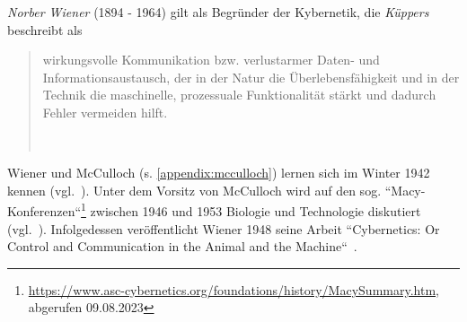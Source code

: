 \textit{Norber Wiener} (1894 - 1964) gilt als Begründer der Kybernetik, die \textit{Küppers} beschreibt als

\blockquote[{~\cite[2]{Kup19}}]{
    wirkungsvolle Kommunikation bzw. verlustarmer Daten- und Informationsaustausch, der in der Natur die Überlebensfähigkeit und in der Technik die maschinelle, prozessuale Funktionalität stärkt und dadurch Fehler vermeiden hilft.
}

Wiener und McCulloch (s. \ref{appendix:mcculloch}) lernen sich im Winter 1942 kennen (vgl.~\cite[218]{Mas90}).
Unter dem Vorsitz von McCulloch wird auf den sog. ``Macy-Konferenzen``\footnote{
    \url{https://www.asc-cybernetics.org/foundations/history/MacySummary.htm}, abgerufen 09.08.2023
} zwischen 1946 und 1953 Biologie und Technologie diskutiert (vgl.~\cite[5]{Arb19}).
Infolgedessen veröffentlicht Wiener 1948 seine Arbeit ``Cybernetics: Or Control and Communication in the Animal and the Machine``~\cite{Wie48}.